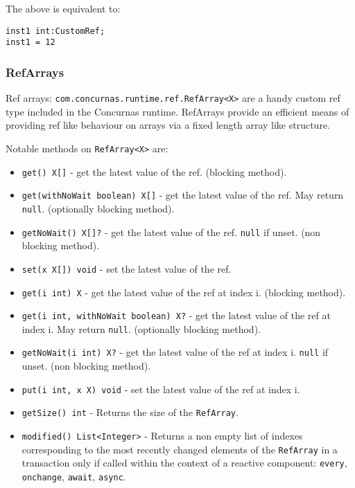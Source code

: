 \documentclass[conc-doc]{subfiles}
\begin{document}
The above is equivalent to:

\begin{lstlisting}
inst1 int:CustomRef; 
inst1 = 12
\end{lstlisting}

\subsubsection{RefArrays}
Ref arrays: \lstinline{com.concurnas.runtime.ref.RefArray<X>} are a handy custom ref type included in the Concurnas runtime. RefArrays provide an efficient means of providing ref like behaviour on arrays via a fixed length array like structure.

Notable methods on \lstinline{RefArray<X>} are:

\begin{itemize}
	\item \lstinline{get() X[]} - get the latest value of the ref. (blocking method).
	\item \lstinline{get(withNoWait boolean) X[]} - get the latest value of the ref. May return \lstinline{null}. (optionally blocking method). 
	\item \lstinline{getNoWait() X[]?} - get the latest value of the ref. \lstinline{null} if unset. (non blocking method).
	\item \lstinline{set(x X[]) void} - set the latest value of the ref.
	\item \lstinline{get(i int) X} - get the latest value of the ref at index i. (blocking method).
	\item \lstinline{get(i int, withNoWait boolean) X?} - get the latest value of the ref at index i. May return \lstinline{null}. (optionally blocking method).
	\item \lstinline{getNoWait(i int) X?} - get the latest value of the ref at index i. \lstinline{null} if unset. (non blocking method).
	\item \lstinline{put(i int, x X) void} - set the latest value of the ref at index i. 
	\item \lstinline{getSize() int} - Returns the size of the \lstinline{RefArray}.
	\item \lstinline{modified() List<Integer>} - Returns a non empty list of indexes corresponding to the most recently changed elements of the \lstinline{RefArray} in a transaction only if called within the context of a reactive component: \lstinline{every}, \lstinline{onchange}, \lstinline{await}, \lstinline{async}.  	
\end{itemize}
\end{document}
